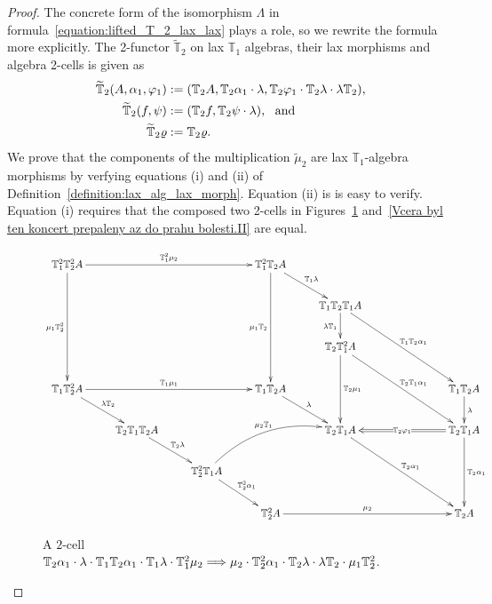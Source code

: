 \documentclass[12pt,leqno]{amsart}
\theoremstyle{definition}
\def\T{\mathbb{T}}
\def\iii#1#2{%
  \ifnum#1=0
    \ifnum#2=0
    \else
      \ifnum#2=1
        {\mathbb T}_2%
      \else
        {\mathbb T}_2^{#2}%
      \fi
    \fi
  \else
    \ifnum#2=0
      \ifnum#1=1
        {\mathbb T}_1%
      \else
        {\mathbb T}_1^{#1}%
      \fi
    \else
      \ifnum#1=1
        {\mathbb T}_1%
      \else
        {\mathbb T}_1^{#1}%
      \fi
      \ifnum#2=1
        {\mathbb T}_2%
      \else
        {\mathbb T}_2^{#2}%
      \fi
    \fi
  \fi
}
\newcommand{\4}{\texttt{4}}
\renewcommand{\phi}{\varphi}
\renewcommand{\rho}{\varrho}
\begin{document}
\begin{proof} The concrete form of the isomorphism $\Lambda$ in formula~\eqref{equation:lifted_T_2_lax_lax} plays a role, so we rewrite the formula
 more explicitly.
The 2-functor $\widetilde{\T}_2$ on lax $\T_1$ algebras, their lax morphisms and algebra 2-cells
is given as
\begin{align*}
\widetilde{\T}_2(A,
  \alpha_1,\phi_1)&:=(\T_2 A,\T_2\alpha_1\cdot\lambda,
  \T_2\phi_1\cdot\T_2\lambda\cdot\lambda\T_2),
\\
\widetilde{\T}_2(f,\psi)&:=(\T_2f,
  \T_2\psi \cdot \lambda), \  \hbox { and}
\\
\widetilde{\T}_2\rho&:=\T_2\rho.
\end{align*}
We prove that the components of the multiplication
$\widetilde{\mu}_2$ are lax $\T_1$-algebra morphisms by verfying 
equations (i) and (ii) of
Definition~\ref{definition:lax_alg_lax_morph}. Equation (ii)
is is easy to verify. Equation (i) requires that the composed two 2-cells
in Figures~\ref{Vcera byl ten koncert prepaleny az do prahu bolesti.I}
and~\ref{Vcera byl ten koncert prepaleny az do prahu bolesti.II}
are equal. 
\begin{figure}
\[
\xymatrix@C=.9cm{
{\iii22}A \ar[rrr]^{\iii20 \mu_2}  \ar[ddd]_{\mu_1\iii02} 
&&&
{\iii21}A \ar[ddd]_{\mu_1\iii01} \ar[rd]^{\iii10\lambda}
\\ 
&&&& {\iii10\iii01\iii10} A \ar[d]_{\lambda \iii10} \ar[rrdd]^{\iii11 \alpha_1} 
\\ 
&&&&{\iii01\iii20}A \ar[dd]^{\iii01 \mu_1}  \ar[rrdd]^{\iii01\iii10\alpha_1}
\\
{\iii12}A \ar[rrr]^{\iii10 \mu_1} \ar[rd]^{\lambda\iii01}   &&& {\iii11}A \ar[dr]^\lambda  &&&
{\iii10\iii01}A \ar[d]^\lambda
\\
& {\iii01\iii10\iii01}A \ar[dr]^{\iii01 \lambda}   &&& {\iii01\iii10}A  \ar[ddrr]^{\iii01\alpha_1}   && {\iii01\iii10}A
\ar[dd]^{\iii01\alpha_1} \ar@{=>}[ll]|{\iii01\phi_1}
\\
&& {\iii02\iii10}A \ar@/^2em/[rru]^{\mu_2 \iii10} \ar[dr]^{\iii02\alpha_1}
\\
&&& {\iii02}A \ar[rrr]^{\mu_2}   &&\hphantom{LLL}& {\iii01}A
}
\]
\caption{\label{Vcera byl ten koncert prepaleny az do prahu bolesti.I}
A $2$-cell $\iii01\alpha_1 \cdot \lambda \cdot
  \iii11\alpha_1 \cdot \iii10 \lambda \cdot \iii20\mu_2
\Longrightarrow \mu_2 \cdot \iii02\alpha_1 \cdot \iii01 \lambda \cdot
\lambda \iii01 \cdot \mu_1 \iii02$.} 
\end{figure}
\begin{figure}

\end{figure}
\end{proof}
\end{document}
